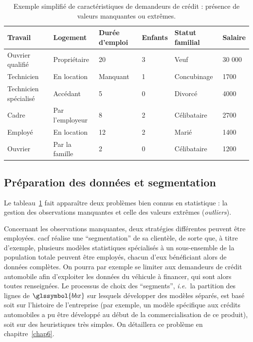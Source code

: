 \begin{table}
\centering
\caption{\label{tab:design} Exemple simplifié de caractéristiques de demandeurs de crédit : présence de valeurs manquantes ou extrêmes.}
\begin{tabular}{l|l|l|l|l|l}
Travail & Logement & Durée d'emploi & Enfants & Statut familial & Salaire \\
\hline
Ouvrier qualifié & Propriétaire & 20 & 3 & Veuf & 30 000  \\
Technicien & En location & Manquant & 1 & Concubinage & {1700}  \\
Technicien spécialisé & Accédant & 5 & 0 & Divorcé & {4000}  \\
Cadre & Par l'employeur & 8 & 2 & Célibataire & {2700}  \\
Employé & En location & 12 & 2 & Marié & {1400}  \\
Ouvrier & Par la famille & 2 & 0 & Célibataire & {1200}  \\
\end{tabular}
\end{table}

\subsection{Préparation des données et segmentation}

Le tableau~\ref{tab:design} fait apparaître deux problèmes bien connus en statistique : la gestion des observations manquantes et celle des valeurs extrêmes (\textit{outliers}).

Concernant les observations manquantes, deux stratégies différentes peuvent être employées. \gls{cacf} réalise une ``segmentation'' de sa clientèle, de sorte que, à titre d'exemple, plusieurs modèles statistiques spécialisés à un sous-ensemble de la population totale peuvent être employés, chacun d'eux bénéficiant alors de données complètes. On pourra par exemple se limiter aux demandeurs de crédit automobile afin d'exploiter les données du véhicule à financer, qui sont alors toutes renseignées. Le processus de choix des ``segments'', \textit{i.e.}\ la partition des lignes de $\glssymbol{bbx}$ sur lesquels développer des modèles séparés, est basé soit sur l'histoire de l'entreprise (par exemple, un modèle spécifique aux crédits automobiles a pu être développé au début de la commercialisation de ce produit), soit sur des heuristiques très simples. On détaillera ce problème en chapitre~\ref{chap6}.

